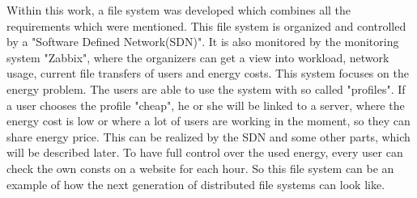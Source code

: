 Within this work, a file system was developed which combines all the requirements which were mentioned. This file system is organized and controlled by a "Software Defined Network(SDN)". It is also monitored by the monitoring system "Zabbix", where the organizers can get a view into workload, network usage, current file transfers of users and energy costs. This system focuses on the energy problem. The users are able to use the system with so called "profiles". If a user chooses the profile "cheap", he or she will be linked to a server, where the energy cost is low or where a lot of users are working in the moment, so they can share energy price. This can be realized by the SDN and some other parts, which will be described later. To have full control over the used energy, every user can check the own consts on a website for each hour. So this file system can be an example of how the next generation of distributed file systems can look like.               